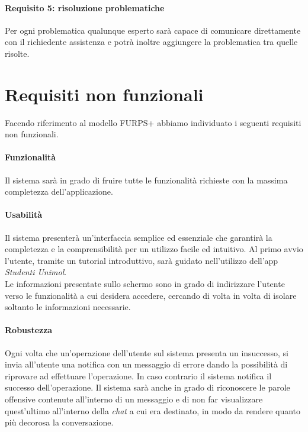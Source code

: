 \paragraph{Requisito 5: risoluzione problematiche\\}
Per ogni problematica qualunque esperto sarà capace di comunicare direttamente con il richiedente assistenza e potrà inoltre aggiungere la problematica tra quelle risolte. 

\section{Requisiti non funzionali}
Facendo riferimento al modello FURPS+ abbiamo individuato i seguenti requisiti
non funzionali.

\paragraph{Funzionalità\\} 
Il sistema sarà in grado di fruire tutte le funzionalità richieste con la massima completezza dell’applicazione.

\paragraph{Usabilità\\} 
Il sistema presenterà un’interfaccia semplice ed essenziale che garantirà la completezza e la comprensibilità per un utilizzo facile ed intuitivo. Al primo avvio l’utente, tramite un tutorial introduttivo, sarà guidato nell’utilizzo dell’app \emph{Studenti Unimol}.\\ 
Le informazioni presentate sullo schermo sono in grado di indirizzare l’utente verso le funzionalità a cui desidera accedere, cercando di volta in volta di isolare soltanto le informazioni necessarie.

\paragraph{Robustezza\\} 
Ogni volta che un’operazione dell’utente sul sistema presenta un insuccesso, si invia all’utente una notifica con un messaggio di errore dando la possibilità di riprovare ad effettuare l’operazione. In caso contrario il sistema notifica il successo dell’operazione. 
Il sistema sarà anche in grado di riconoscere le parole offensive contenute all’interno di un messaggio e di non far visualizzare quest’ultimo all’interno della \emph{chat} a cui era destinato, in modo da rendere quanto più decorosa la conversazione. 

